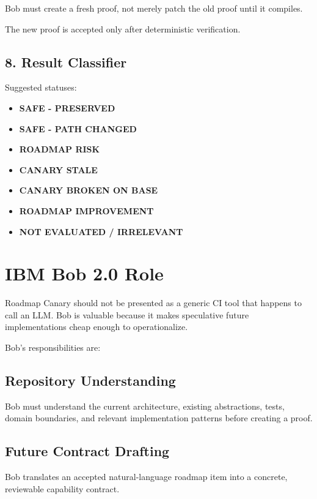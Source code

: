 \documentclass[12pt]{article}
\begin{document}
Bob must create a fresh proof, not merely patch the old proof until it compiles.

The new proof is accepted only after deterministic verification.

\subsection{8. Result Classifier}

Suggested statuses:

\begin{itemize}
    \item \textbf{SAFE - PRESERVED}
    \item \textbf{SAFE - PATH CHANGED}
    \item \textbf{ROADMAP RISK}
    \item \textbf{CANARY STALE}
    \item \textbf{CANARY BROKEN ON BASE}
    \item \textbf{ROADMAP IMPROVEMENT}
    \item \textbf{NOT EVALUATED / IRRELEVANT}
\end{itemize}

\section{IBM Bob 2.0 Role}

Roadmap Canary should not be presented as a generic CI tool that happens to call an LLM. Bob is valuable because it makes speculative future implementations cheap enough to operationalize.

Bob's responsibilities are:

\subsection{Repository Understanding}

Bob must understand the current architecture, existing abstractions, tests, domain boundaries, and relevant implementation patterns before creating a proof.

\subsection{Future Contract Drafting}

Bob translates an accepted natural-language roadmap item into a concrete, reviewable capability contract.
\end{document}
